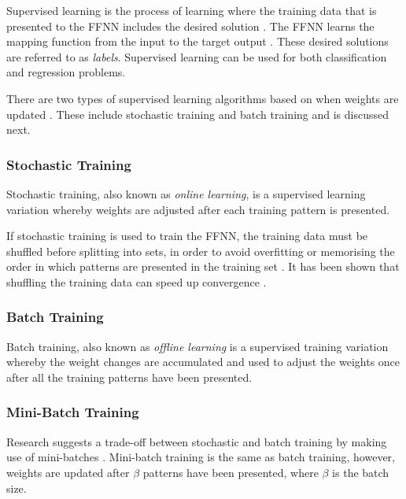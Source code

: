 Supervised learning is the process of learning where
the training data that is presented to the \ac{FFNN} includes the desired
solution \cite{ref:geron:2017}.  The \ac{FFNN} learns the mapping function from
the input to the target output \cite{ref:brownlee:2016}. These desired solutions
are referred to as \textit{labels}. Supervised
learning can be used for both classification and regression problems.

There are two types of supervised learning algorithms based on when weights are
updated \cite{ref:engelbrecht:2007}. These include stochastic training and batch
training and is discussed next.


\subsubsection{Stochastic Training}
\label{sec:anns:training:stochastic}

Stochastic training, also known as \textit{online learning}, is a supervised
learning variation whereby weights are adjusted after each training pattern is
presented.

If stochastic training is used to train the
\ac{FFNN}, the training data must be shuffled before splitting into sets, in
order to avoid overfitting or memorising the order in which patterns are
presented in the training set \cite{ref:engelbrecht:2007}. It has been shown
that shuffling the training data can speed up convergence
\cite{ref:bengio:2012}.


\subsubsection{Batch Training}
\label{sec:anns:training:batch}

Batch training, also known as \textit{offline learning} is a supervised training variation whereby
the weight changes are accumulated and used to adjust the weights once after all
the training patterns have been presented.


\subsubsection{Mini-Batch Training}
\label{sec:anns:training:mini_batch}

Research suggests a trade-off between stochastic and batch training by making
use of mini-batches \cite{ref:bengio:2012}. Mini-batch training is the same as
batch training, however, weights are updated after $\beta$ patterns have been
presented, where $\beta$ is the batch size.


